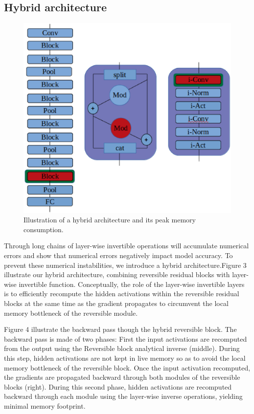 \documentclass[10pt,twocolumn,letterpaper]{article}
\begin{document}
\subsection{Hybrid architecture}
\begin{figure}[h]
\begin{center}
\includegraphics[height=0.5\linewidth]{Figure3.eps}
\end{center}
   \caption{Illustration of a hybrid architecture and its peak
memory consumption.}
\end{figure}
Through long chains of layer-wise invertible operations will accumulate numerical errors and show that numerical errors negatively impact model accuracy. To prevent these numerical instabilities, we introduce a hybrid architecture.Figure 3 illustrate our hybrid architecture, combining reversible residual blocks with layer-wise invertible function. Conceptually, the role of the layer-wise invertible layers is to efficiently recompute the hidden activations within the reversible residual blocks at the same time as the gradient propagates to circumvent the local memory bottleneck of the reversible module. 

Figure 4 illustrate the backward pass though the hybrid reversible block. The backward pass is made of two phases: 
First the input activations are recomputed from the output using the Reversible block analytical inverse (middle).
During this step, hidden activations are not kept in live memory so as to avoid the local memory bottleneck of the reversible block.
Once the input activation recomputed, the gradients are propagated backward through both modules of the reversible blocks (right).
During this second phase, hidden activations are recomputed backward through each module using the layer-wise inverse operations, yielding minimal memory footprint.
\end{document}

